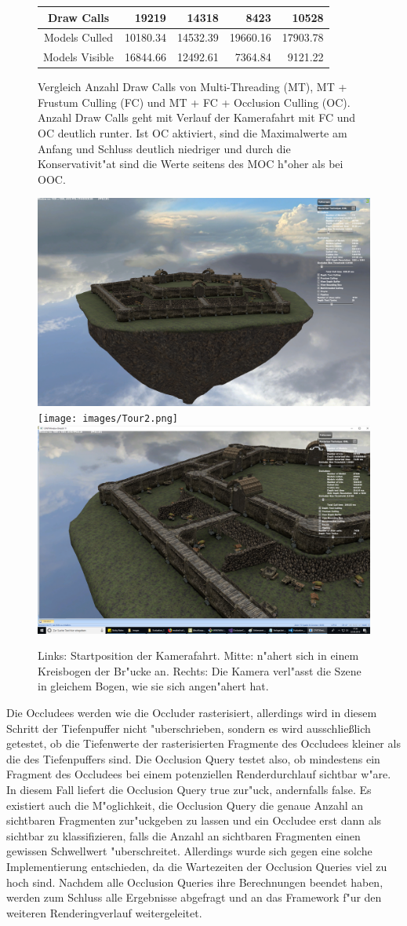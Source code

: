 \documentclass[journal]{vgtc}
\begin{document}
\begin{figure}
\begin{minipage}{\textwidth}
{\begin{tabular}{| c | r | r | r | r |}
				Draw Calls           & 19219     & 14318     & 8423     & 10528 		\\ \hline
				Models Culled        & 10180.34  & 14532.39  & 19660.16 & 17903.78 	\\ \hline
				Models Visible       & 16844.66  & 12492.61  & 7364.84  & 9121.22 	\\ \hline
		\end{tabular}}
	\end{minipage}
	\caption{Vergleich Anzahl Draw Calls von Multi-Threading (MT), MT + Frustum Culling (FC) und MT + FC + Occlusion Culling (OC). Anzahl Draw Calls geht mit Verlauf der Kamerafahrt mit FC und OC deutlich runter. Ist OC aktiviert, sind die Maximalwerte am Anfang und Schluss deutlich niedriger und durch die Konservativit"at sind die Werte seitens des MOC h"oher als bei OOC.}
	\label{fig:OGL_MOC_frustum_culling}
\end{figure}

\begin{figure}%
	\includegraphics[width=0.33\columnwidth]{images/Tour1.png}%
	\texttt{[image: images/Tour2.png]}%
	\includegraphics[width=0.33\columnwidth]{images/Tour3.png}%
	\caption{Links: Startposition der Kamerafahrt. Mitte: n"ahert sich in einem Kreisbogen der Br"ucke an. Rechts: Die Kamera verl"asst die Szene in gleichem Bogen, wie sie sich angen"ahert hat.}%
	\label{fig:fahrt}%
\end{figure}

Die Occludees werden wie die Occluder rasterisiert, allerdings wird in diesem Schritt der Tiefenpuffer nicht "uberschrieben, sondern es wird ausschlie{\ss}lich getestet, ob
die Tiefenwerte der rasterisierten Fragmente des Occludees kleiner als die des Tiefenpuffers sind.
Die Occlusion Query testet also, ob mindestens ein Fragment des Occludees bei einem potenziellen Renderdurchlauf sichtbar w"are.
In diesem Fall liefert die Occlusion Query \glqq true\grqq{} zur"uck, andernfalls \glqq false\grqq{}.
Es existiert auch die M"oglichkeit, die Occlusion Query die genaue Anzahl an sichtbaren Fragmenten zur"uckgeben zu lassen und ein Occludee erst dann als sichtbar zu klassifizieren, falls die Anzahl an sichtbaren Fragmenten einen gewissen Schwellwert "uberschreitet.
Allerdings wurde sich gegen eine solche Implementierung entschieden, da die Wartezeiten der Occlusion Queries viel zu hoch sind.
Nachdem alle Occlusion Queries ihre Berechnungen beendet haben, werden zum Schluss alle Ergebnisse abgefragt und an das Framework f"ur den weiteren Renderingverlauf weitergeleitet.
\end{document}
